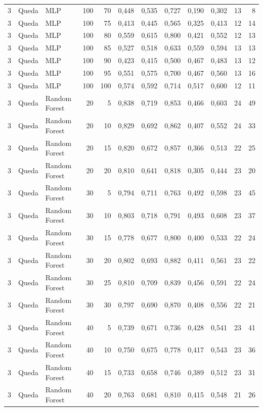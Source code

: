 \begin{longtable}{@{}rllrrrrrrrrr@{}}
3 & Queda & MLP & 100 & 70 & 0,448 & 0,535 & 0,727 & 0,190 & 0,302 & 13 & 8 \\
3 & Queda & MLP & 100 & 75 & 0,413 & 0,445 & 0,565 & 0,325 & 0,413 & 12 & 14 \\
3 & Queda & MLP & 100 & 80 & 0,559 & 0,615 & 0,800 & 0,421 & 0,552 & 12 & 13 \\
3 & Queda & MLP & 100 & 85 & 0,527 & 0,518 & 0,633 & 0,559 & 0,594 & 13 & 13 \\
3 & Queda & MLP & 100 & 90 & 0,423 & 0,415 & 0,500 & 0,467 & 0,483 & 13 & 12 \\
3 & Queda & MLP & 100 & 95 & 0,551 & 0,575 & 0,700 & 0,467 & 0,560 & 13 & 16 \\
3 & Queda & MLP & 100 & 100 & 0,574 & 0,592 & 0,714 & 0,517 & 0,600 & 12 & 11 \\
3 & Queda & Random Forest & 20 & 5 & 0,838 & 0,719 & 0,853 & 0,466 & 0,603 & 24 & 49 \\
3 & Queda & Random Forest & 20 & 10 & 0,829 & 0,692 & 0,862 & 0,407 & 0,552 & 24 & 33 \\
3 & Queda & Random Forest & 20 & 15 & 0,820 & 0,672 & 0,857 & 0,366 & 0,513 & 22 & 25 \\
3 & Queda & Random Forest & 20 & 20 & 0,810 & 0,641 & 0,818 & 0,305 & 0,444 & 23 & 20 \\
3 & Queda & Random Forest & 30 & 5 & 0,794 & 0,711 & 0,763 & 0,492 & 0,598 & 23 & 45 \\
3 & Queda & Random Forest & 30 & 10 & 0,803 & 0,718 & 0,791 & 0,493 & 0,608 & 23 & 37 \\
3 & Queda & Random Forest & 30 & 15 & 0,778 & 0,677 & 0,800 & 0,400 & 0,533 & 22 & 24 \\
3 & Queda & Random Forest & 30 & 20 & 0,802 & 0,693 & 0,882 & 0,411 & 0,561 & 23 & 22 \\
3 & Queda & Random Forest & 30 & 25 & 0,810 & 0,709 & 0,839 & 0,456 & 0,591 & 22 & 24 \\
3 & Queda & Random Forest & 30 & 30 & 0,797 & 0,690 & 0,870 & 0,408 & 0,556 & 22 & 21 \\
3 & Queda & Random Forest & 40 & 5 & 0,739 & 0,671 & 0,736 & 0,428 & 0,541 & 23 & 41 \\
3 & Queda & Random Forest & 40 & 10 & 0,750 & 0,675 & 0,778 & 0,417 & 0,543 & 23 & 36 \\
3 & Queda & Random Forest & 40 & 15 & 0,733 & 0,658 & 0,746 & 0,389 & 0,512 & 23 & 31 \\
3 & Queda & Random Forest & 40 & 20 & 0,763 & 0,681 & 0,810 & 0,415 & 0,548 & 21 & 26 \\

\end{longtable}
